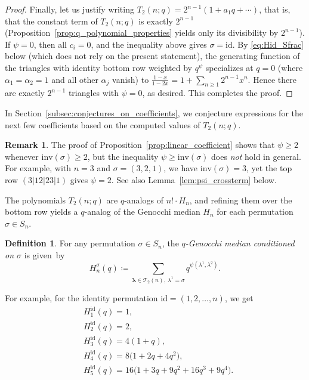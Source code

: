 \documentclass[10pt,a4paper]{amsart}
\numberwithin{equation}{section}
\theoremstyle{definition}
\newtheorem{Definition}[Theorem]{Definition}
\newtheorem{Remark}[Theorem]{Remark}
\begin{document}
\begin{proof}
	Finally, let us justify writing $T_2(n;q)=2^{n-1}(1+a_1q+\cdots)$, that
	is, that the constant term of $T_2(n;q)$ is exactly $2^{n-1}$
	(Proposition~\ref{prop:q_polynomial_properties} yields only its divisibility by
	$2^{n-1}$).
	If $\psi=0$, then all $c_i=0$, and the inequality above gives
	$\sigma=\mathrm{id}$.
	By \eqref{eq:Hid_Sfrac} below
	(which does not rely on the present statement),
	the generating function of the triangles
	with identity bottom row weighted by $q^{\psi}$ specializes at $q=0$
	(where $\alpha_1=\alpha_2=1$ and all other $\alpha_j$ vanish) to
	$\frac{1-x}{1-2x}=1+\sum_{n\ge1}2^{n-1}x^{n}$.
	Hence there are exactly $2^{n-1}$ triangles with $\psi=0$, as desired.
	This completes the proof.
\end{proof}

In Section~\ref{subsec:conjectures_on_coefficients}, we conjecture expressions
for the next few coefficients based on the computed values of $T_2(n;q)$.
\begin{Remark}
	\label{rem:psi_vs_inv} The proof of Proposition~\ref{prop:linear_coefficient} shows
	that $\psi \ge 2$ whenever $\mathrm{inv}(\sigma) \ge 2$, but the inequality
	$\psi \ge \mathrm{inv}(\sigma)$ does \emph{not} hold in general.
	For example, with $n=3$ and $\sigma = (3,2,1)$, we have
	$\mathrm{inv}(\sigma) = 3$, yet the top row $(3|12|23|1)$ gives $\psi = 2$.
	See also Lemma~\ref{lem:psi_crossterm} below.
\end{Remark}

The polynomials $T_2(n;q)$ are $q$-analogs of $n! \cdot H_n$, and refining them
over the bottom row yields a $q$-analog of the Genocchi median $H_n$ for each
permutation $\sigma\in S_n$.

\begin{Definition}
	\label{def:H_sigma} For any permutation $\sigma \in S_n$, the
	\emph{$q$-Genocchi median conditioned on $\sigma$} is given~by
	\begin{equation*}
		H_n^\sigma(q) \coloneqq \sum_{\boldsymbol\lambda \in
		\mathcal{T}_2(n),\ \lambda^1 = \sigma} q^{\psi(\lambda^1, \lambda^2)}.
	\end{equation*}
\end{Definition}

For example, for the identity permutation $\mathrm{id} = (1,2,\dots,n)$, we
get
\begin{align*}
	&H_1^{\mathrm{id}}(q)= 1, \\
	&H_2^{\mathrm{id}}(q)= 2, \\
	&H_3^{\mathrm{id}}(q)= 4(1+q), \\
	&H_4^{\mathrm{id}}(q)= 8\bigl(1+  2q + 4q^2\bigr), \\
	&H_5^{\mathrm{id}}(q)= 16\bigl(1 + 3q + 9q^2 + 16q^3 + 9q^4\bigr).
\end{align*}
\end{document}
